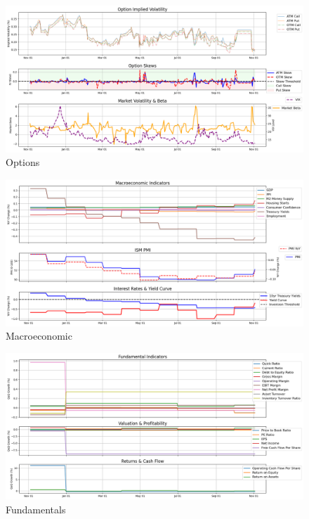 \documentclass[8pt]{scrartcl}
\begin{document}
\begin{figure}[H]
    \centering
    \includegraphics[width=1\linewidth]{judge_reviews/GOOGL_M_gpt-4o-mini/2019-11-04/judge_Option_Implied_Volatility.png}
    \caption{Options}
\end{figure}

\begin{figure}[H]
    \centering
    \includegraphics[width=1\linewidth]{judge_reviews/GOOGL_M_gpt-4o-mini/2019-11-04/judge_Macroeconomic_Indicators.png}
    \caption{Macroeconomic}
\end{figure}

\begin{figure}[H]
    \centering
    \includegraphics[width=1\linewidth]{judge_reviews/GOOGL_M_gpt-4o-mini/2019-11-04/judge_Fundamental_Indicators.png}
    \caption{Fundamentals}
\end{figure}
\end{document}
